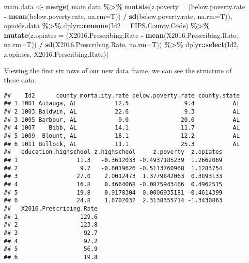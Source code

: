 \documentclass[
]{article}
\newenvironment{Shaded}{\begin{snugshade}}{\end{snugshade}}
\newcommand{\AttributeTok}[1]{\textcolor[rgb]{0.13,0.29,0.53}{#1}}
\newcommand{\FunctionTok}[1]{\textcolor[rgb]{0.13,0.29,0.53}{\textbf{#1}}}
\newcommand{\NormalTok}[1]{#1}
\newcommand{\OtherTok}[1]{\textcolor[rgb]{0.56,0.35,0.01}{#1}}
\newcommand{\SpecialCharTok}[1]{\textcolor[rgb]{0.81,0.36,0.00}{\textbf{#1}}}
\begin{document}
\begin{Shaded}
\begin{Highlighting}[]
\NormalTok{main.data }\OtherTok{\textless{}{-}} \FunctionTok{merge}\NormalTok{(}
\NormalTok{  main.data  }\SpecialCharTok{\%\textgreater{}\%}
  \FunctionTok{mutate}\NormalTok{(}\AttributeTok{z.poverty =}\NormalTok{ (below.poverty.rate }\SpecialCharTok{{-}} \FunctionTok{mean}\NormalTok{(below.poverty.rate, }\AttributeTok{na.rm=}\NormalTok{T)) }\SpecialCharTok{/} 
           \FunctionTok{sd}\NormalTok{(below.poverty.rate, }\AttributeTok{na.rm=}\NormalTok{T)), }
\NormalTok{  opioids.data }\SpecialCharTok{\%\textgreater{}\%}
\NormalTok{  dplyr}\SpecialCharTok{::}\FunctionTok{rename}\NormalTok{(}\AttributeTok{Id2 =}\NormalTok{ FIPS.County.Code) }\SpecialCharTok{\%\textgreater{}\%} 
  \FunctionTok{mutate}\NormalTok{(}\AttributeTok{z.opiates =}\NormalTok{ (X2016.Prescribing.Rate }\SpecialCharTok{{-}} \FunctionTok{mean}\NormalTok{(X2016.Prescribing.Rate, }\AttributeTok{na.rm=}\NormalTok{T)) }\SpecialCharTok{/}
           \FunctionTok{sd}\NormalTok{(X2016.Prescribing.Rate, }\AttributeTok{na.rm=}\NormalTok{T)) }\SpecialCharTok{\%\textgreater{}\%}
\NormalTok{    dplyr}\SpecialCharTok{::}\FunctionTok{select}\NormalTok{(Id2, z.opiates, X2016.Prescribing.Rate))}
\end{Highlighting}
\end{Shaded}

Viewing the first six rows of our new data frame, we can see the
structure of these data: \vspace{6mm}

\begin{verbatim}
##    Id2      county mortality.rate below.poverty.rate county.state
## 1 1001 Autauga, AL           12.5                9.4           AL
## 2 1003 Baldwin, AL           22.6                9.3           AL
## 3 1005 Barbour, AL            9.0               20.0           AL
## 4 1007    Bibb, AL           14.1               11.7           AL
## 5 1009  Blount, AL           18.1               12.2           AL
## 6 1011 Bullock, AL           11.1               25.3           AL
##   education.highschool z.highschool     z.poverty  z.opiates
## 1                 11.3   -0.3612033 -0.4937185239  1.2662069
## 2                  9.7   -0.6019626 -0.5113760968  1.1283754
## 3                 27.0    2.0012473  1.3779842063  0.3893133
## 4                 16.8    0.4664068 -0.0875943466  0.4962515
## 5                 19.8    0.9178304  0.0006935181 -0.4614399
## 6                 24.8    1.6702032  2.3138355714 -1.3430863
##   X2016.Prescribing.Rate
## 1                  129.6
## 2                  123.8
## 3                   92.7
## 4                   97.2
## 5                   56.9
## 6                   19.8
\end{verbatim}
\end{document}
